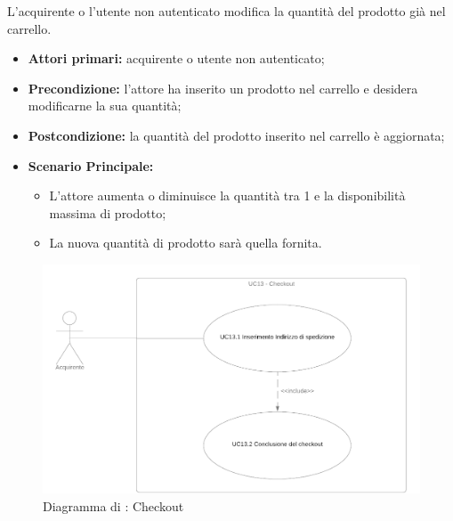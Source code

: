 
L'acquirente o l'utente non autenticato modifica la quantità del prodotto già nel carrello.
\begin{itemize}
    \item \textbf{Attori primari:} acquirente o utente non autenticato;
    \item \textbf{Precondizione:} l'attore ha inserito un prodotto nel carrello e desidera modificarne la sua quantità;
    \item \textbf{Postcondizione:} la quantità del prodotto inserito nel carrello è aggiornata;
    \item \textbf{Scenario Principale:}
        \begin{itemize}
            \item L'attore aumenta o diminuisce la quantità tra 1 e la disponibilità massima di prodotto;
            \item La nuova quantità di prodotto sarà quella fornita.
        \end{itemize}
\end{itemize}


\begin{figure}[H]
    \centering
    \includegraphics[scale=0.4]{Immagini/DiagrammiUC/UC13Checkout.png}
    \caption{Diagramma di \actualUC: Checkout} 
    \label{fig:Checkout}
\end{figure}


